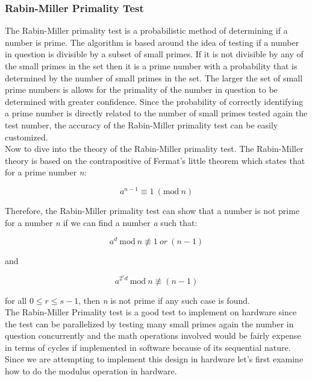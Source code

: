 \documentclass[journal]{IEEEtran}
\begin{document}
\subsubsection{Rabin-Miller Primality Test}
The Rabin-Miller primality test is a probabilistic method of determining if a number is prime. The algorithm is based around the idea of testing if a number in question is divisible by a subset of small primes. If it is not divisible by any of the small primes in the set then it is a prime number with a probability that is determined by the number of small primes in the set. The larger the set of small prime numbers is allows for the primality of the number in question to be determined with greater confidence. Since the probability of correctly identifying a prime number is directly related to the number of small primes tested again the test number, the accuracy of the Rabin-Miller primality test can be easily customized. \cite{cheung} \\

Now to dive into the theory of the Rabin-Miller primality test. The Rabin-Miller theory is based on the contrapositive of Fermat's little theorem which states that for a prime number \textit{n}:

	\begin{displaymath}
		a^{n-1} \equiv 1\ (\textrm{mod}\ n)
	\end{displaymath}

Therefore, the Rabin-Miller primality test can show that a number is not prime for a number \textit{n} if we can find a number \textit{a} such that:

	\begin{displaymath}
		a^d\ \textrm{mod}\ n\not \equiv 1\ or\ (n-1)
	\end{displaymath}
		
and

	\begin{displaymath}
		a^{2^rd}\ \textrm{mod}\ n \not \equiv (n-1)
	\end{displaymath}

for all $0 \le r \le s-1$, then \textit{n} is not prime if any such case is found. \cite{wiki_miller-rabin} \\

The Rabin-Miller Primality test is a good test to implement on hardware since the test can be parallelized by testing many small primes again the number in question concurrently and the math operations involved would be fairly expense in terms of cycles if implemented in software because of its sequential nature. Since we are attempting to implement this design in hardware let's first examine how to do the modulus operation in hardware. \\
\end{document}
